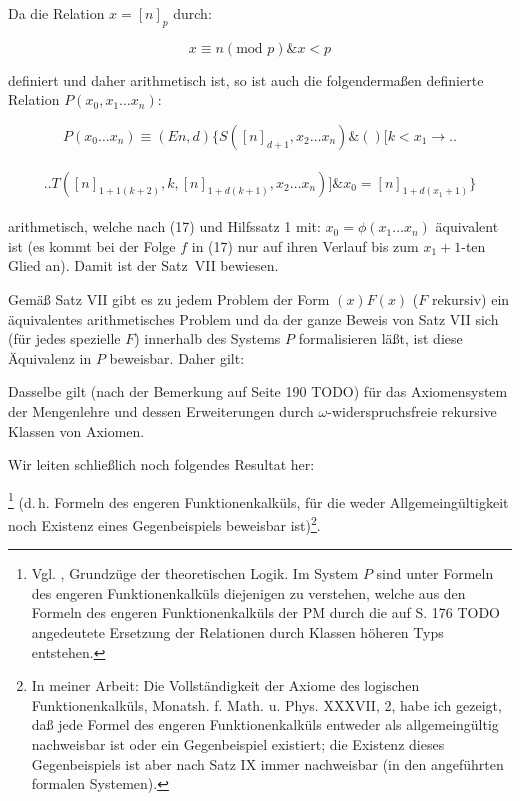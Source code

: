 \documentclass[draft]{scrartcl}
\newlength{\spacebetweenbreakedequations}
\newlength{\spaceafterbreakedequation}
\let\oldleft\left
\let\oldright\right
\def\left#1{%
	    \global\advance\bracketnum1\relax 
		\colorlet{temp}{.}%
		    \csname bracketcolor\the\bracketnum\endcsname
			\oldleft#1%
			    \color{temp}%
	}
\def\right#1{%
	    \colorlet{temp}{.}%
		\csname bracketcolor\the\bracketnum\endcsname
		    \oldright#1%
			\global\advance\bracketnum-1\relax
			    \color{temp}%
	}
\def\left#1{#1}
\def\right#1{#1}
\begin{document}
Da die Relation $x = \left[n\right]_p$ durch:

$$
x \equiv n \left(\text{mod } p\right) \& x < p
$$

definiert und daher arithmetisch ist, so ist auch die folgendermaßen definierte Relation $P\left(x_0, x_1 \dots x_n\right)$:

$$
P\left(x_0 \dots x_n\right) \equiv \left(En, d\right) \left\{S\left(\left[n\right]_{d + 1}, x_2 \dots x_n\right) \& \left(\right) \left[k < x_1 \longrightarrow\right.\right.
$$\\[\spacebetweenbreakedequations]
$$ \left.\left.T\left(\left[n\right]_{1 + 1 \left(k + 2\right)}, k, \left[n\right]_{1 + d \left(k + 1\right)}, x_2 \dots x_n\right)\right] \& x_0 = \left[n\right]_{1 + d \left(x_1 + 1\right)}\right\}
$$\\[\spaceafterbreakedequation]
arithmetisch, welche nach (17) und Hilfssatz 1 mit:
$x_0 = \phi\left(x_1 \dots x_n\right)$ äquivalent ist (es kommt
		bei der Folge $f$ in (17) nur auf ihren Verlauf 
		bis zum $x_1 + 1$-ten Glied an). Damit ist der
Satz~VII bewiesen.

Gemäß Satz VII gibt es zu jedem Problem der Form
$\left(x\right)F\left(x\right)$ ($F$ rekursiv) ein äquivalentes arithmetisches
Problem und da der ganze Beweis von Satz VII sich (für jedes spezielle $F$) innerhalb des Systems $P$ formalisieren läßt, ist diese Äquivalenz in $P$ beweisbar. Daher gilt:


Dasselbe gilt (nach der Bemerkung auf Seite 190 TODO)
für das Axiomensystem der Mengenlehre und dessen Erweiterungen durch $\omega$-widerspruchsfreie rekursive
Klassen von Axiomen.

Wir leiten schließlich noch folgendes Resultat her:

\footnote{Vgl. , Grundzüge der theoretischen Logik. Im System $P$ sind unter Formeln des engeren Funktionenkalküls diejenigen zu verstehen, welche aus den Formeln des engeren Funktionenkalküls der PM durch die auf S. 176 TODO angedeutete Ersetzung der Relationen durch Klassen höheren Typs entstehen.}
(d.\,h. Formeln des engeren Funktionenkalküls, für die weder Allgemeingültigkeit noch Existenz eines Gegenbeispiels beweisbar ist)\footnote{In meiner Arbeit: Die Vollständigkeit der Axiome des logischen Funktionenkalküls, Monatsh. f. Math. u. Phys. XXXVII, 2, habe ich gezeigt, daß jede Formel des engeren Funktionenkalküls entweder als allgemeingültig nachweisbar ist oder ein Gegenbeispiel existiert; die Existenz dieses Gegenbeispiels ist aber nach Satz IX  immer nachweisbar (in den angeführten formalen Systemen).}.
\end{document}
